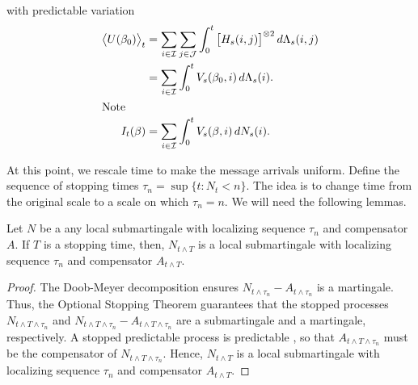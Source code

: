\documentclass[aoas,preprint]{imsart}
\begin{document}
with predictable variation
\begin{align*}
    \big\langle U(\beta_0) \big\rangle_t
        &=
            \sum_{i \in \mathcal{I}}
            \sum_{j \in \mathcal{J}}
            \int_0^t
                \big[ H_s(i,j) \big]^{\otimes 2} \,
                d\Lambda_s(i,j) \\
        &=
            \sum_{i \in \mathcal{I}}
            \int_0^t
                V_s(\beta_0, i) \,
                d\Lambda_s(i). \\
\intertext{Note}
    I_t(\beta)
        &=
            \sum_{i \in \mathcal{I}}
            \int_0^t
                V_s(\beta, i) \,
                dN_s(i).
\end{align*}

At this point, we rescale time to make the message arrivals uniform.  Define
the sequence of stopping times $\tau_n = \sup\{ t : N_t < n \}$.  The idea
is to change time from the original scale to a scale on which $\tau_n = n$.
We will need the following lemmas.

\begin{lemma}
    Let $N$ be a any local submartingale with localizing sequence $\tau_n$
    and compensator $A$.  If $T$ is a stopping time, then, $N_{t\wedge T}$ is
    a local submartingale with localizing sequence $\tau_n$
    and compensator $A_{t \wedge T}$.
\end{lemma}
\begin{proof}
    The Doob-Meyer decomposition ensures
    $N_{t \wedge \tau_n} - A_{t \wedge \tau_n}$ is a martingale.  Thus,
    the Optional Stopping Theorem guarantees that the stopped processes
    $N_{t \wedge T \wedge \tau_n}$ and
    $N_{t \wedge T \wedge \tau_n} - A_{t \wedge T \wedge \tau_n}$ are
    a submartingale and a martingale, respectively.  
    A stopped predictable process is predictable
    \cite[Prop. 2.4]{jacod1987limit}, so that $A_{t \wedge T \wedge \tau_n}$
    must be the compensator of $N_{t \wedge T \wedge \tau_n}$.
    Hence,
    $N_{t \wedge T}$ is a local submartingale with
    localizing sequence $\tau_n$ and compensator $A_{t \wedge T}$.
\end{proof}
\end{document}
